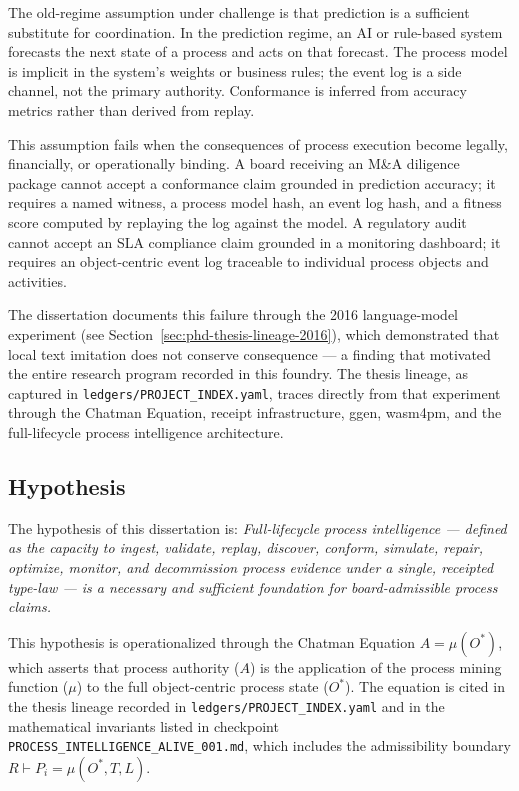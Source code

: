 The old-regime assumption under challenge is that prediction is a sufficient substitute for
coordination. In the prediction regime, an AI or rule-based system forecasts the next state of
a process and acts on that forecast. The process model is implicit in the system's weights or
business rules; the event log is a side channel, not the primary authority. Conformance is
inferred from accuracy metrics rather than derived from replay.

This assumption fails when the consequences of process execution become legally, financially,
or operationally binding. A board receiving an M\&A diligence package cannot accept a
conformance claim grounded in prediction accuracy; it requires a named witness, a process model
hash, an event log hash, and a fitness score computed by replaying the log against the model.
A regulatory audit cannot accept an SLA compliance claim grounded in a monitoring dashboard;
it requires an object-centric event log traceable to individual process objects and activities.

The dissertation documents this failure through the 2016 language-model experiment (see
Section~\ref{sec:phd-thesis-lineage-2016}), which demonstrated that local text imitation does
not conserve consequence --- a finding that motivated the entire research program recorded in
this foundry. The thesis lineage, as captured in \texttt{ledgers/PROJECT\_INDEX.yaml}, traces
directly from that experiment through the Chatman Equation, receipt infrastructure, ggen,
wasm4pm, and the full-lifecycle process intelligence architecture.

\subsection{Hypothesis}
\label{sec:phd-thesis-question-hypothesis}

The hypothesis of this dissertation is: \emph{Full-lifecycle process intelligence --- defined
as the capacity to ingest, validate, replay, discover, conform, simulate, repair, optimize,
monitor, and decommission process evidence under a single, receipted type-law --- is a
necessary and sufficient foundation for board-admissible process claims.}

This hypothesis is operationalized through the Chatman Equation
$A = \mu(O^*)$, which asserts that process authority ($A$) is the application of the process
mining function ($\mu$) to the full object-centric process state ($O^*$). The equation is
cited in the thesis lineage recorded in \texttt{ledgers/PROJECT\_INDEX.yaml} and in the
mathematical invariants listed in checkpoint
\texttt{PROCESS\_INTELLIGENCE\_ALIVE\_001.md}, which includes the admissibility boundary
$R \vdash P_i = \mu(O^*, T, L)$.

